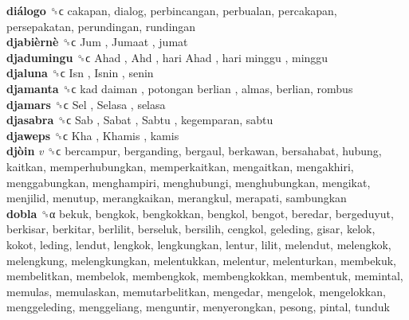 \textbf{diálogo} ␝ϲ  cakapan, dialog, perbincangan, perbualan, percakapan, persepakatan, perundingan, rundingan  \\
\textbf{djabièrnè} ␝ϲ   Jum ,  Jumaat , jumat  \\
\textbf{djadumingu} ␝ϲ   Ahad ,  Ahd ,  hari Ahad ,  hari minggu , minggu  \\
\textbf{djaluna} ␝ϲ   Isn ,  Isnin , senin  \\
\textbf{djamanta} ␝ϲ   kad daiman ,  potongan berlian , almas, berlian, rombus  \\
\textbf{djamars} ␝ϲ   Sel ,  Selasa , selasa  \\
\textbf{djasabra} ␝ϲ   Sab ,  Sabat ,  Sabtu , kegemparan, sabtu  \\
\textbf{djaweps} ␝ϲ   Kha ,  Khamis , kamis  \\
\textbf{djòin} \emph{v}  ␝ϲ  bercampur, berganding, bergaul, berkawan, bersahabat, hubung, kaitkan, memperhubungkan, memperkaitkan, mengaitkan, mengakhiri, menggabungkan, menghampiri, menghubungi, menghubungkan, mengikat, menjilid, menutup, merangkaikan, merangkul, merapati, sambungkan  \\
\textbf{dobla} ␝α  bekuk, bengkok, bengkokkan, bengkol, bengot, beredar, bergeduyut, berkisar, berkitar, berlilit, berseluk, bersilih, cengkol, geleding, gisar, kelok, kokot, leding, lendut, lengkok, lengkungkan, lentur, lilit, melendut, melengkok, melengkung, melengkungkan, melentukkan, melentur, melenturkan, membekuk, membelitkan, membelok, membengkok, membengkokkan, membentuk, memintal, memulas, memulaskan, memutarbelitkan, mengedar, mengelok, mengelokkan, menggeleding, menggeliang, menguntir, menyerongkan, pesong, pintal, tunduk  \\

